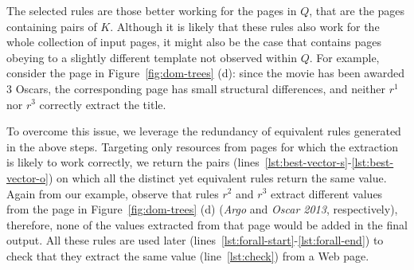 


The selected rules are those better working for the pages in $Q$, that are the pages containing pairs of $K$. Although it is likely that these rules also work for the whole collection of input pages, it might also be the case that {\allpages} contains pages obeying to a slightly different template not observed within $Q$. For example, consider the page in Figure~\ref{fig:dom-trees} (d): since the movie has been awarded 3 Oscars, the corresponding page has small structural differences, and neither $r^1$ nor $r^3$ correctly extract the title. 


To overcome this issue, we leverage the redundancy of equivalent rules generated in the above steps. Targeting only resources from pages for which the extraction is likely to work correctly, we return the pairs (lines~\ref{lst:best-vector-s}-\ref{lst:best-vector-o}) on which all the distinct yet equivalent rules return the same value. Again from our example, observe that rules $r^2$ and $r^3$ extract different values from the page in Figure~\ref{fig:dom-trees} (d) ({\em Argo} and {\em Oscar 2013}, respectively), therefore, none of the values extracted from that page would be added in the final output. 
All these rules are used later (lines~\ref{lst:forall-start}-\ref{lst:forall-end}) to check that they extract the same value (line~\ref{lst:check}) from a Web page.



